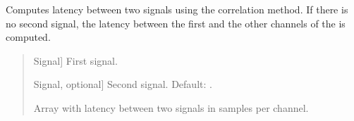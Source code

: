 \documentclass[letterpaper,10pt,english]{sphinxmanual}
\begin{document}
\begin{fulllineitems}
\label{\detokenize{modules/dsptoolbox.standard_functions:dsptoolbox.standard_functions.latency}}
\pysigstartsignatures
{}
\pysigstopsignatures
\sphinxAtStartPar
Computes latency between two signals using the correlation method.
If there is no second signal, the latency between the first and the other
channels of the is computed.
\begin{quote}\begin{description}
\begin{description}
\sphinxlineitem{\sphinxstylestrong{in1}}{[}Signal{]}
\sphinxAtStartPar
First signal.

\sphinxlineitem{\sphinxstylestrong{in2}}{[}Signal, optional{]}
\sphinxAtStartPar
Second signal. Default: .

\end{description}

\begin{description}
\sphinxlineitem{\sphinxstylestrong{latency\_per\_channel\_samples}}{[}\sphinxtitleref{np.ndarray}{]}
\sphinxAtStartPar
Array with latency between two signals in samples per channel.

\end{description}

\end{description}\end{quote}

\end{fulllineitems}

\end{document}
